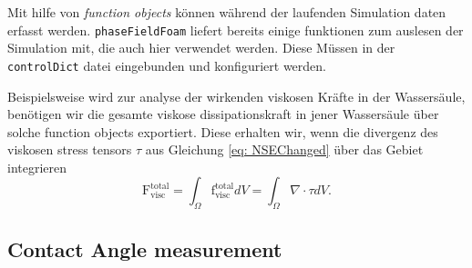 Mit hilfe von \textit{function objects} können während der laufenden Simulation daten erfasst werden. \texttt{phaseFieldFoam} liefert bereits einige funktionen zum auslesen der Simulation mit, die auch hier verwendet werden. Diese Müssen in der \texttt{controlDict} datei eingebunden und konfiguriert werden. 

Beispielsweise wird zur analyse der wirkenden viskosen Kräfte in der Wassersäule, benötigen wir die gesamte viskose dissipationskraft in jener Wassersäule über solche function objects exportiert. Diese erhalten wir, wenn die divergenz des viskosen stress tensors $\tau$ aus Gleichung \ref{eq: NSEChanged} über das Gebiet integrieren
\begin{equation}
    \mathrm{F}_{\mathrm{visc}}^{\mathrm{total}} = \int_{\Omega} \mathrm{f}_{\mathrm{visc}}^{\mathrm{total}} dV = \int_{\Omega} \nabla \cdot \tau dV.
\end{equation}



\subsection{Contact Angle measurement}
\label{sec: CA_Measurement}


